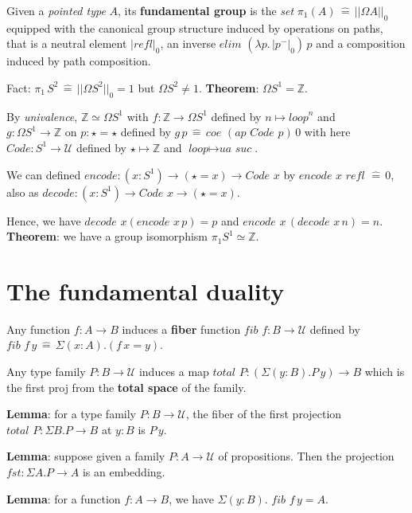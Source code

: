 \documentclass[a4paper]{article}
\begin{document}
Given a \textit{pointed type} $A$, its \textbf{fundamental group} is the \textit{set} $\pi_1(A) \, \hat{=} \, || \Omega A ||_0$ equipped with the canonical group structure induced by operations on paths, that is a neutral element $|\textit{refl}|_0$, an inverse $\textit{elim } (\lambda p. \, |p^-|_0) \, p$ and a composition induced by path composition.

Fact: $\pi_1 \, S^2 \, \hat{=} \, || \Omega S^2 ||_0 = 1$ but $\Omega S^2 \bm{\neq} 1$. \textbf{Theorem}: $\Omega S^1 = \mathbb{Z}$.

By \textit{univalence}, $\mathbb{Z} \simeq \Omega S^1$ with $f : \mathbb{Z} \to \Omega S^1$ defined by $n \mapsto \textit{loop}^n$ and $g : \Omega S^1 \to \mathbb{Z} \text{ on } p : \star = \star$ defined by $g \, p \, \hat{=} \, \textit{coe } (\textit{ap } \textit{Code } p) \, 0$ with here $\textit{Code} : S^1 \to \mathcal{U}$ defined by $\star \mapsto \mathbb{Z}$ and $\textit{loop} \mapsto \textit{ua suc}$.

We can defined $\textit{encode} : (x : S^1) \to (\star = x) \to \textit{Code } x$ by $\textit{encode } x \textit{ refl } \hat{=} \, 0$, also as $\textit{decode} : (x : S^1) \to \textit{Code } x \to (\star = x)$.

Hence, we have $\textit{decode } x (\textit{encode } x \, p) = p$ and $\textit{encode } x \, (\textit{decode } x \, n) = n$. \textbf{Theorem}: we have a group isomorphism $\pi_1 S^1 \simeq \mathbb{Z}$.

\section*{The fundamental duality}

Any function $f : A \to B$ induces a \textbf{fiber} function $\textit{fib } f : B \to \mathcal{U}$ defined by $\textit{fib } f \, y \, \hat{=} \, \Sigma(x : A).(f \, x = y)$.

Any type family $P : B \to \mathcal{U}$ induces a map $\textit{total } P : (\Sigma(y : B). P \, y) \to B$ which is the first proj from the \textbf{total space} of the family.

\textbf{Lemma}: for a type family $P : B \to \mathcal{U}$, the fiber of the first projection $\textit{total } P : \Sigma B. P \to B$ at $y : B$ is $P \, y$.

\textbf{Lemma}: suppose given a family $P : A \to \mathcal{U}$ of propositions. Then the projection $\textit{fst} : \Sigma A. P \to A$ is an embedding.

\textbf{Lemma}: for a function $f : A \to B$, we have $\Sigma (y : B). \textit{ fib } f \, y = A$.
\end{document}
